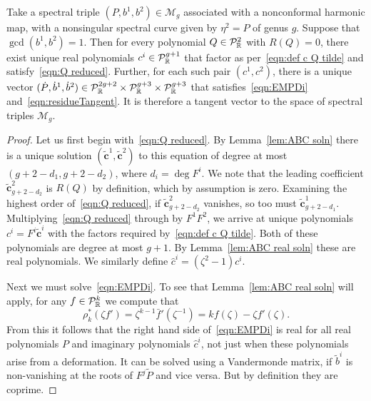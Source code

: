 \documentclass{article}
\begin{document}
\begin{lem}[Case (a)]\label{lem:tangent generic}
Take a spectral triple $(P,b^1,b^2)\in\mathcal{M}_g$ associated with a nonconformal harmonic map, with a nonsingular spectral curve given by $\eta^2 = P$ of genus $g$. Suppose that $\gcd(b^1,b^2) = 1$. Then for every polynomial $Q \in \mathcal{P}^2_{\mathbb{R}}$ with $R(Q) = 0$, there exist unique real polynomials $c^i\in\mathcal{P}^{g+1}_{\mathbb{R}}$ that factor as per~\eqref{eqn:def c Q tilde} and satisfy~\eqref{eqn:Q reduced}. Further, for each such pair $(c^1,c^2)$, there is a unique vector $(\dot P, \dot b^1, \dot b^2) \in \mathcal{P}_{\mathbb{R}}^{2g+2}\times\mathcal{P}_{\mathbb{R}}^{g+3}\times\mathcal{P}_{\mathbb{R}}^{g+3}$ that satisfies~\eqref{eqn:EMPDi} and~\eqref{eqn:residueTangent}. It is therefore a tangent vector to the space of spectral triples $\mathcal{M}_g$.

\begin{proof}
Let us first begin with~\eqref{eqn:Q reduced}. By Lemma~\ref{lem:ABC soln} there is a unique solution $(\mathbf{\tilde{c}}^1, \mathbf{\tilde{c}}^2)$ to this equation of degree at most $(g+2-d_1, g+2-d_2)$, where $d_i = \deg F^i$. We note that the leading coefficient $\mathbf{\tilde{c}}^2_{g+2-d_2}$ is $R(Q)$ by definition, which by assumption is zero.
Examining the highest order of~\eqref{eqn:Q reduced}, if $\mathbf{\tilde{c}}^2_{g+2-d_2}$ vanishes, so too must $\mathbf{\tilde{c}}^1_{g+2-d_1}$. Multiplying~\eqref{eqn:Q reduced} through by $F^1F^2$, we arrive at unique polynomials $c^i = F^i \mathbf{\tilde{c}}^i$ with the factors required by~\eqref{eqn:def c Q tilde}. Both of these polynomials are degree at most $g+1$. By Lemma~\ref{lem:ABC real soln} these are real polynomials. We similarly define $\hat{c}^i = (\zeta^2 -1)c^i$.

Next we must solve~\eqref{eqn:EMPDi}. To see that Lemma~\ref{lem:ABC real soln} will apply, for any $f\in\mathcal{P}_{\mathbb{R}}^{k}$ we compute that
\[
\rho^*_k(\zeta f') = \zeta^{k-1}\bar{f}'(\zeta^{-1}) = k f(\zeta) - \zeta f'(\zeta).
\]
From this it follows that the right hand side of~\eqref{eqn:EMPDi} is real for all real polynomials $P$ and imaginary polynomials $\hat{c}^i$, not just when these polynomials arise from a deformation.
It can be solved using a Vandermonde matrix, if $\tilde{b}^i$ is non-vanishing at the roots of $F^j \tilde{P}$ and vice versa. But by definition they are coprime.


\end{proof}
\end{lem}
\end{document}
